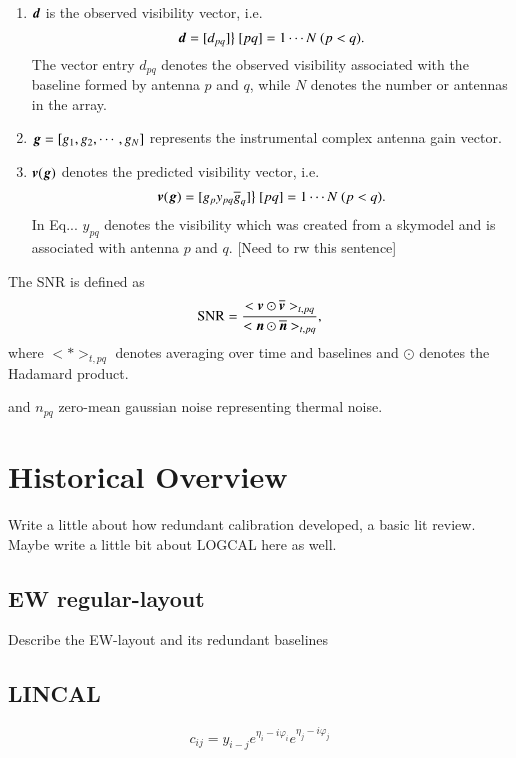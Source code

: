 \documentclass[a4paper,fleqn,usenatbib]{mnras}
\newcommand{\bg}{\bmath{g}}
\newcommand{\bd}{\bmath{d}}
\newcommand{\bv}{\bmath{v}}
\newcommand{\bn}{\bmath{n}}
\newcommand{\conj}[1]{\overline{#1}}
\begin{document}
\begin{enumerate}
 \item $\bd$ is the observed visibility vector, i.e. 
 \begin{equation}
  \bd = [d_{pq}] \big \} ~ [pq] = 1\cdots N ~ (p<q).
 \end{equation}
 The vector entry $d_{pq}$ denotes the observed visibility associated with the baseline formed by antenna $p$ and $q$, while $N$ denotes the number or antennas
 in the array. 
 \item $\bg = [g_1,g_2,\cdots,g_N]$ represents the instrumental complex antenna gain vector.
 \item $\bv(\bg)$ denotes the predicted visibility vector, i.e.
 \begin{equation}
  \bv(\bg) = [g_p y_{pq}\conj{g}_q]  \big \} ~ [pq] = 1\cdots N ~ (p<q).
 \end{equation}
 In Eq... $y_{pq}$ denotes the visibility which was created from a skymodel and is associated with antenna $p$ and $q$. [Need to rw this sentence] 
\end{enumerate}

The SNR is defined as 
\begin{equation}
\textrm{SNR} = \frac{<\bv\odot\conj{\bv}>_{t,pq}}{<\bn\odot\conj{\bn}>_{t,pq}}, 
\end{equation}
where $<*>_{t,pq}$ denotes averaging over time and baselines and $\odot$ denotes the Hadamard product.









and $n_{pq}$ 
zero-mean gaussian noise representing thermal noise. 

\section{Historical Overview}

Write a little about how redundant calibration developed, a basic lit review.
Maybe write a little bit about LOGCAL here as well.

\subsection{EW regular-layout}
Describe the EW-layout and its redundant baselines

\subsection{LINCAL}
\begin{equation}
c_{ij} = y_{i-j} e^{\eta_i - i \varphi_i} e^{\eta_j - i \varphi_j}
\end{equation}
\end{document}
